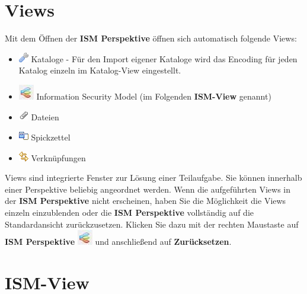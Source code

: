 \documentclass[a4paper,10pt]{book}
\begin{document}
\section{Views}
Mit dem Öffnen der \textbf{ISM Perspektive} öffnen sich automatisch folgende Views:
\begin{itemize}
\item \includegraphics[height=2ex]{Icon/Control_Kataloge.png} Kataloge - Für den Import eigener Kataloge wird das Encoding für jeden Katalog einzeln im Katalog-View eingestellt.
\item \includegraphics[height=2ex]{Icon/Informationssicherheitsmodell.png} Information Security Model (im Folgenden \textbf{ISM-View} genannt)
\item \includegraphics[height=2ex]{Icon/Hinzufuegen.png} Dateien
\item \includegraphics[height=2ex]{Icon/Cheatsheet_view.png} Spickzettel
\item \includegraphics[height=2ex]{Icon/Verknuepfungen.png} Verknüpfungen
\end{itemize}
Views sind integrierte Fenster zur Lösung einer Teilaufgabe. Sie können innerhalb einer Perspektive beliebig angeordnet werden.
Wenn die aufgeführten Views in der \textbf{ISM Perspektive} nicht erscheinen, haben Sie die Möglichkeit die Views einzeln einzublenden oder die
\textbf{ISM Perspektive} vollständig auf die Standardansicht zurückzusetzen. Klicken Sie dazu mit der rechten Maustaste auf \textbf{ISM Perspektive}
\includegraphics[height=2ex]{Icon/Informationssicherheitsmodell.png} und anschließend auf \textbf{Zurücksetzen}.

\section{ISM-View}
\end{document}
